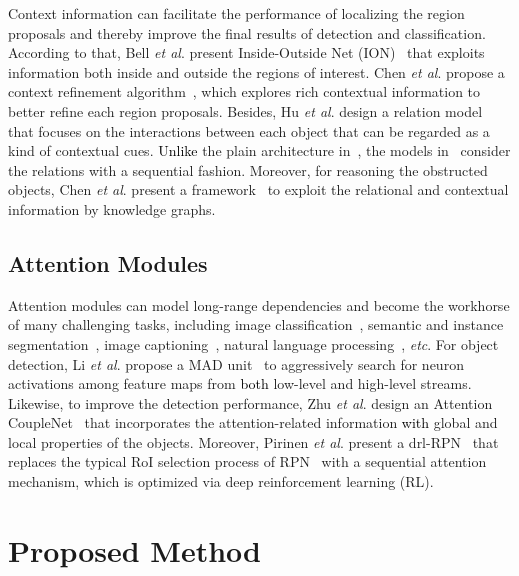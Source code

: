 \documentclass[journal]{IEEEtran}
\newcommand{\etal}{\textit{et al}.\xspace}
\newcommand{\etc}{\textit{etc}\xspace}
\def\myblue{\textcolor{black}}
\begin{document}
	Context information can facilitate the performance of localizing the region proposals and thereby improve the final results of detection and classification. According to that, Bell \etal present Inside-Outside Net (ION)~\cite{bell2016inside} that exploits information both inside and outside the regions of interest. Chen \etal propose a context refinement algorithm~\cite{chen2018context}, which explores rich contextual information to better refine each region proposals. Besides, Hu \etal design a relation model~\cite{hu2018relation} that focuses on the interactions between each object that can be regarded as a kind of contextual cues. \myblue{Unlike} the plain architecture in~\cite{hu2018relation}, the models in~\cite{chen2017spatial,li2017attentive,stewart2016end} consider the relations with a sequential fashion. Moreover, for reasoning the obstructed objects, Chen \etal present a framework~\cite{chen2018iterative} to exploit the relational and contextual information by knowledge graphs.
	
	\subsection{Attention Modules}
	
	Attention modules can model long-range dependencies and become the workhorse of many challenging tasks, including image classification~\cite{mnih2014recurrent,wang2017residual}, semantic and instance segmentation~\cite{chen2016attention,ren2017end}, image captioning~\cite{lu2017knowing,xu2015show,you2016image}, natural language processing~\cite{bahdanau2014neural,lin2017structured,tan2018deep,vaswani2017attention}, \etc.
	For object detection, Li \etal propose a MAD unit~\cite{li2018zoom} to aggressively search for neuron activations among feature maps from \myblue{both} low-level and high-level streams. Likewise, to improve the detection performance, Zhu \etal design an Attention CoupleNet~\cite{zhu2019attention} that incorporates the attention-related information \myblue{with} global and local properties of the objects. Moreover, Pirinen \etal present a drl-RPN~\cite{pirinen2018deep} that replaces the typical RoI selection process of RPN~\cite{ren2015faster} with a sequential attention mechanism, which is optimized via deep reinforcement learning (RL).
	
	\section{Proposed Method}
	
\end{document}
